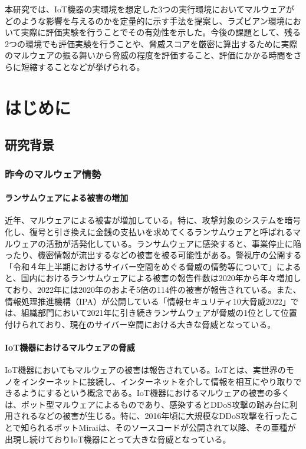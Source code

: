 \documentclass[12pt,a4paper,titlepage,report]{jsbook}
\begin{document}
本研究では、IoT機器の実環境を想定した3つの実行環境においてマルウェアがどのような影響を与えるのかを定量的に示す手法を提案し、ラズビアン環境において実際に評価実験を行うことでその有効性を示した。今後の課題として、残る2つの環境でも評価実験を行うことや、脅威スコアを厳密に算出するために実際のマルウェアの振る舞いから脅威の程度を評価すること、評価にかかる時間をさらに短縮することなどが挙げられる。



\tableofcontents
\listoffigures
\listoftables
\newpage


\pagestyle{plain}




\chapter{はじめに}
\section{研究背景}
\subsection{昨今のマルウェア情勢}
\subsubsection{ランサムウェアによる被害の増加}
近年、マルウェアによる被害が増加している。特に、攻撃対象のシステムを暗号化し、復号と引き換えに金銭の支払いを求めてくるランサムウェアと呼ばれるマルウェアの活動が活発化している。ランサムウェアに感染すると、事業停止に陥ったり、機密情報が流出するなどの被害を被る可能性がある。警視庁の公開する「令和４年上半期におけるサイバー空間をめぐる脅威の情勢等について」\cite{policereport}によると、国内におけるランサムウェアによる被害の報告件数は2020年から年々増加しており、2022年には2020年のおよそ5倍の114件の被害が報告されている。また、情報処理推進機構（IPA）が公開している「情報セキュリティ10大脅威2022」\cite{bestthreat2022}では、組織部門において2021年に引き続きランサムウェアが脅威の1位として位置付けられており、現在のサイバー空間における大きな脅威となっている。

\subsubsection{IoT機器におけるマルウェアの脅威}
IoT機器においてもマルウェアの被害は報告されている。IoTとは、実世界のモノをインターネットに接続し、インターネットを介して情報を相互にやり取りできるようにするという概念である。IoT機器におけるマルウェアの被害の多くは、ボット型マルウェアによるものであり、感染するとDDoS攻撃の踏み台に利用されるなどの被害が生じる。特に、2016年頃に大規模なDDoS攻撃を行ったことで知られるボットMiraiは、そのソースコードが公開されて以降、その亜種が出現し続けておりIoT機器にとって大きな脅威となっている。\cite{malwaresurvey}
\end{document}
